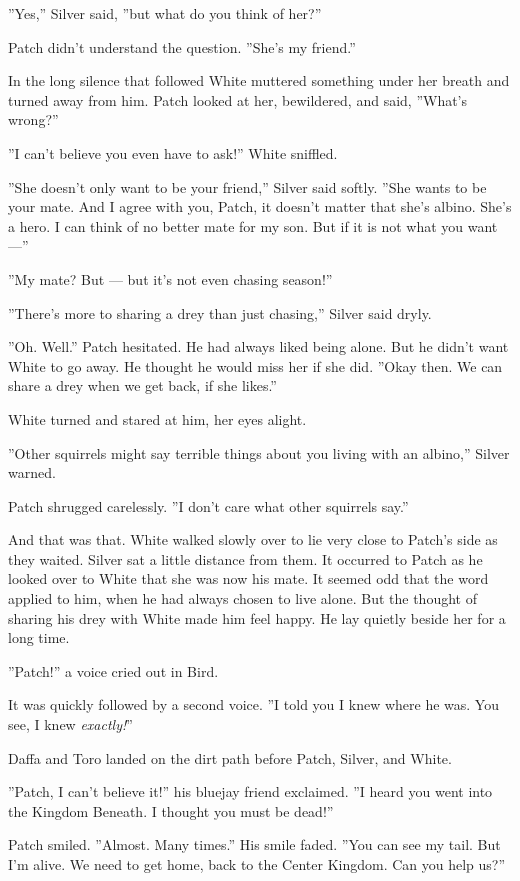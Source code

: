 \documentclass[12pt]{book}
\begin{document}
''Yes,'' Silver said, ''but what do you think of her?''

Patch didn't understand the question. ''She's my friend.''

In the long silence that followed White muttered something under her
breath and turned away from him. Patch looked at her, bewildered, and
said, ''What's wrong?''

''I can't believe you even have to ask!'' White sniffled.

''She doesn't only want to be your friend,'' Silver said softly. ''She
wants to be your mate. And I agree with you, Patch, it doesn't matter
that she's albino. She's a hero. I can think of no better mate for my
son. But if it is not what you want ---''

''My mate? But --- but it's not even chasing season!''

''There's more to sharing a drey than just chasing,'' Silver said
dryly.

''Oh. Well.'' Patch hesitated. He had always liked being alone. But he
didn't want White to go away. He thought he would miss her if she
did. ''Okay then. We can share a drey when we get back, if she
likes.''

White turned and stared at him, her eyes alight.

''Other squirrels might say terrible things about you living with an
albino,'' Silver warned.

Patch shrugged carelessly. ''I don't care what other squirrels say.''

And that was that. White walked slowly over to lie very close to
Patch's side as they waited. Silver sat a little distance from
them. It occurred to Patch as he looked over to White that she was now
his mate. It seemed odd that the word applied to him, when he had
always chosen to live alone. But the thought of sharing his drey with
White made him feel happy. He lay quietly beside her for a long time.

''Patch!'' a voice cried out in Bird.

It was quickly followed by a second voice. ''I told you I knew where
he was. You see, I knew \textit{exactly!}''

Daffa and Toro landed on the dirt path before Patch, Silver, and
White.

''Patch, I can't believe it!'' his bluejay friend exclaimed. ''I heard
you went into the Kingdom Beneath. I thought you must be dead!''

Patch smiled. ''Almost. Many times.'' His smile faded. ''You can see
my tail. But I'm alive. We need to get home, back to the Center
Kingdom. Can you help us?''
\end{document}
